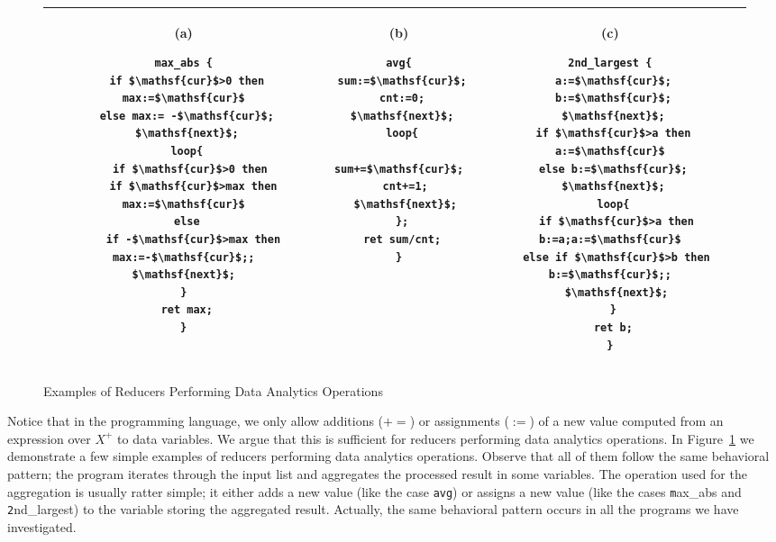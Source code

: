 \documentclass[runningheads,a4paper]{llncs}
\newcommand\cur{\mathsf{cur}}
\newcommand\next{\mathsf{next}}
\newcommand\addeq{+\!\!=}
\begin{document}
\begin{figure}
	\centering
	\lstset{language=C,
		basicstyle=\ttfamily\scriptsize}
	\begin{tabular}{|c|c|c|}
		\hline
		\begin{minipage}[t]{0.39\textwidth}
			(a)
			\begin{lstlisting}[mathescape=true]
max_abs {
 if $\cur$>0 then max:=$\cur$
 else max:= -$\cur$;
 $\next$;
 loop{
  if $\cur$>0 then
   if $\cur$>max then max:=$\cur$
  else 
   if -$\cur$>max then max:=-$\cur$;;
  $\next$;  
 } 
 ret max;
}
	\end{lstlisting}
		\end{minipage}&
		\begin{minipage}[t]{0.22\textwidth}
			(b)
			\begin{lstlisting}[mathescape=true]
avg{
 sum:=$\cur$;
 cnt:=0;
 $\next$;
 loop{
  sum+=$\cur$;
  cnt+=1;
  $\next$;
 };
 ret sum/cnt;
}
			\end{lstlisting}
		\end{minipage}&
		\begin{minipage}[t]{0.35\textwidth}
			(c) 
			\begin{lstlisting}[mathescape=true]
2nd_largest {
 a:=$\cur$;
 b:=$\cur$;
 $\next$;
 if $\cur$>a then a:=$\cur$
 else b:=$\cur$;
 $\next$;
 loop{
  if $\cur$>a then b:=a;a:=$\cur$
  else if $\cur$>b then b:=$\cur$;;
  $\next$;
 }
 ret b;
}
			\end{lstlisting}		
		\end{minipage}\\
		\hline		
	\end{tabular}
	\caption{Examples of Reducers Performing Data Analytics Operations}
	\label{fig:examples}
\end{figure}

Notice that in the programming language, we only allow additions ($\addeq$) or assignments ($:=$) of a new value computed from an expression over $X^+$ to data variables. 
We argue that this is sufficient for reducers performing data analytics operations.
In Figure~\ref{fig:examples} we demonstrate a few simple examples of reducers performing data analytics operations. Observe that all of them follow the same behavioral pattern; the program iterates through the input list and aggregates the processed result in some variables. The operation used for the aggregation is usually ratter simple; it either adds a new value (like the case \texttt{avg}) or assigns a new value (like the cases {\texttt max\_abs} and {\texttt 2nd\_largest}) to the variable storing the aggregated result. Actually, the same behavioral pattern occurs in all the programs we have investigated.
\end{document}
